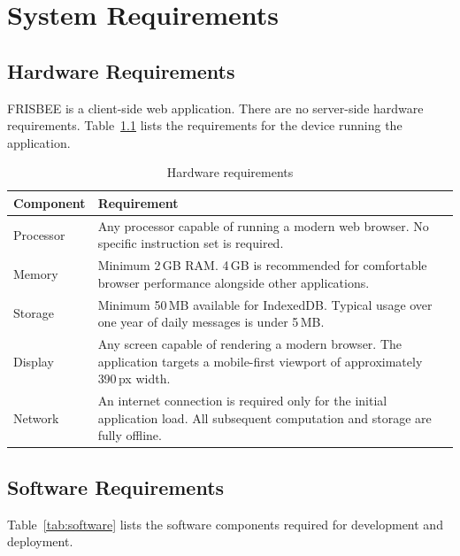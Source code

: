 \documentclass[11pt, a4paper]{report}
\begin{document}
\chapter{System Requirements}

\section{Hardware Requirements}

FRISBEE is a client-side web application. There are no server-side hardware
requirements. Table~\ref{tab:hardware} lists the requirements for the device
running the application.

\begin{table}[H]
\centering
\caption{Hardware requirements}
\label{tab:hardware}
\begin{tabularx}{\textwidth}{@{} p{2.8cm} X @{}}
\toprule
\textbf{Component} & \textbf{Requirement} \\
\midrule
Processor
  & Any processor capable of running a modern web browser.
    No specific instruction set is required. \\[5pt]
Memory
  & Minimum 2\,GB RAM. 4\,GB is recommended for comfortable
    browser performance alongside other applications. \\[5pt]
Storage
  & Minimum 50\,MB available for IndexedDB. Typical usage over
    one year of daily messages is under 5\,MB. \\[5pt]
Display
  & Any screen capable of rendering a modern browser.
    The application targets a mobile-first viewport of
    approximately 390\,px width. \\[5pt]
Network
  & An internet connection is required only for the initial
    application load. All subsequent computation and storage
    are fully offline. \\
\bottomrule
\end{tabularx}
\end{table}

\section{Software Requirements}

Table~\ref{tab:software} lists the software components required for
development and deployment.
\end{document}
